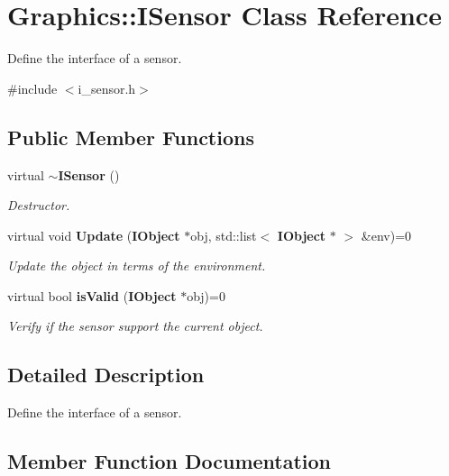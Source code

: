 \section{Graphics\+:\+:I\+Sensor Class Reference}
\label{class_graphics_1_1_i_sensor}


Define the interface of a sensor.  




{\ttfamily \#include $<$i\+\_\+sensor.\+h$>$}

\subsection*{Public Member Functions}
\begin{DoxyCompactItemize}
\item 
virtual {\bf $\sim$\+I\+Sensor} ()\label{class_graphics_1_1_i_sensor_a48b21797770f8ab82091f5dac6fb77f1}

\begin{DoxyCompactList}\small\item\em Destructor. \end{DoxyCompactList}\item 
virtual void {\bf Update} ({\bf I\+Object} $\ast$obj, std\+::list$<$ {\bf I\+Object} $\ast$ $>$ \&env)=0
\begin{DoxyCompactList}\small\item\em Update the object in terms of the environment. \end{DoxyCompactList}\item 
virtual bool {\bf is\+Valid} ({\bf I\+Object} $\ast$obj)=0
\begin{DoxyCompactList}\small\item\em Verify if the sensor support the current object. \end{DoxyCompactList}\end{DoxyCompactItemize}


\subsection{Detailed Description}
Define the interface of a sensor. 

\subsection{Member Function Documentation}
